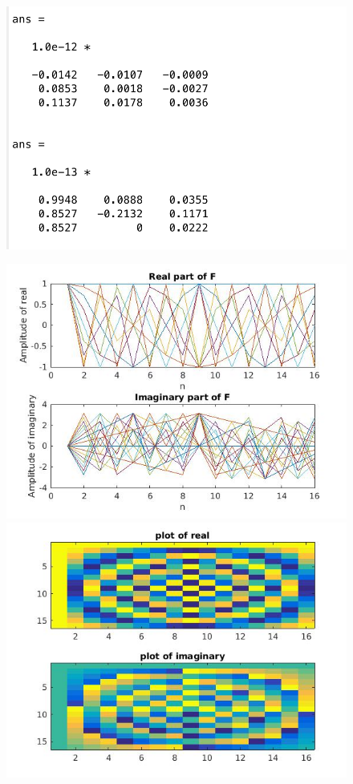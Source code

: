 \documentclass{article}
\begin{document}
\begin{figure}[H]

\includegraphics[scale = .5]{report3_1}
\end{figure}

\begin{figure}[H]

\includegraphics[scale =.4]{report4_1}
\includegraphics[scale =.4]{report4_2}
\end{figure}
\end{document}
